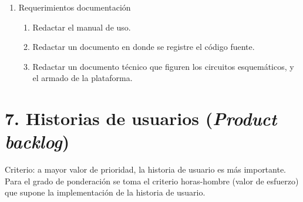 \documentclass[
11pt, %
codirector, %
]{charter}
\begin{document}
\begin{enumerate}
\vspace{2cm} 

\item Requerimientos documentación
	\begin{enumerate}
	\item Redactar el manual de uso. 
	\item Redactar un documento en donde se registre el código 
	fuente.
	\item Redactar un documento técnico que figuren los circuitos
	esquemáticos, y el armado de la plataforma.
	\end{enumerate}
\end{enumerate}

\section{7. Historias de usuarios (\textit{Product backlog})}
\label{sec:backlog}

Criterio: a mayor valor de prioridad, la historia de usuario es más importante. Para el grado de ponderación se toma el criterio horas-hombre (valor de esfuerzo) que supone la implementación de la historia de usuario.
\end{document}
